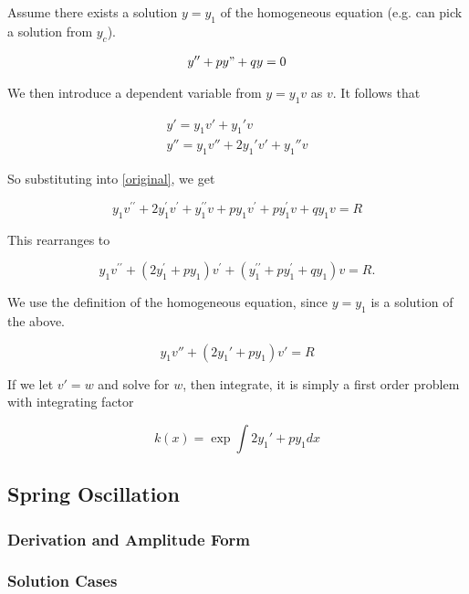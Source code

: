 Assume there exists a solution $y=y_1$ of the homogeneous equation (e.g. can pick a solution from $y_c$).

\begin{eqnarray}
    y''+py"+qy=0
\end{eqnarray}

We then introduce a dependent variable from $y=y_1v$ as $v$. It follows that

\begin{eqnarray}
    y'=y_1v'+y_1'v\\
    y''=y_1v''+2y_1'v'+y_1''v
\end{eqnarray}

So substituting into \ref{original}, we get

\begin{equation}
    y_{1} v^{\prime \prime}+2 y_{1}^{\prime} v^{\prime}+y_{1}^{\prime \prime} v+p y_{1} v^{\prime}+p y_{1}^{\prime} v+q y_{1} v=R
\end{equation}

This rearranges to

\begin{equation}
    y_{1} v^{\prime \prime}+\left(2 y_{1}^{\prime}+p y_{1}\right) v^{\prime}+\left(y_{1}^{\prime \prime}+p y_{1}^{\prime}+q y_{1}\right) v=R .
\end{equation}

We use the definition of the homogeneous equation, since $y=y_1$ is a solution of the above.

\begin{equation}
    y_1v''+(2y_1'+py_1)v'=R
\end{equation}

If we let $v'=w$ and solve for $w$, then integrate, it is simply a first order problem with integrating factor

\begin{equation}
    k(x)=\exp{\int 2y_1'+py_1 dx}
\end{equation}

\subsection{Spring Oscillation}

\subsubsection{Derivation and Amplitude Form}

\subsubsection{Solution Cases}